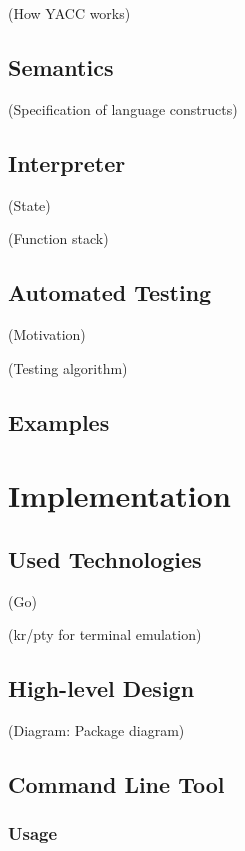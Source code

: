 \documentclass[twoside]{scrreprt}
\begin{document}
        (How YACC works)

\section{Semantics}

        (Specification of language constructs)

\section{Interpreter}

        (State)

        (Function stack)

\section{Automated Testing}

        (Motivation)

        (Testing algorithm)

\section{Examples}

\chapter{Implementation}

\section{Used Technologies}

    (Go)

    (kr/pty for terminal emulation)

\section{High-level Design}

    (Diagram: Package diagram)

\section{Command Line Tool}

\subsection{Usage}
\end{document}

